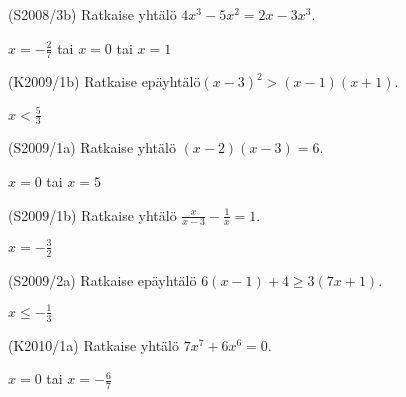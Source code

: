 
\begin{tehtava}
(S2008/3b) Ratkaise yhtälö $4x^3-5x^2=2x-3x^3$.
\begin{vastaus}
$x=-\frac{2}{7}$ tai $x=0$ tai $x=1$
\end{vastaus}
\end{tehtava}

\begin{tehtava}
(K2009/1b) Ratkaise epäyhtälö$(x-3)^2>(x-1)(x+1)$.
\begin{vastaus}
$x<\frac{5}{3}$
\end{vastaus}
\end{tehtava}

\begin{tehtava}
(S2009/1a) Ratkaise yhtälö $(x-2)(x-3)=6$. 
\begin{vastaus}
$x=0$ tai $x=5$
\end{vastaus}
\end{tehtava}

\begin{tehtava}
(S2009/1b) Ratkaise yhtälö $\frac{x}{x-3}-\frac{1}{x}=1$.
\begin{vastaus}
$x=-\frac{3}{2}$
\end{vastaus}
\end{tehtava}

\begin{tehtava}
(S2009/2a) Ratkaise epäyhtälö $6(x-1)+4 \geq 3(7x+1)$. 
\begin{vastaus}
$x \leq -\frac{1}{3}$
\end{vastaus}
\end{tehtava}


\begin{tehtava}
(K2010/1a) Ratkaise yhtälö $7x^7+6x^6=0$.
\begin{vastaus}
$x=0$ tai $x=-\frac{6}{7}$
\end{vastaus}
\end{tehtava}

